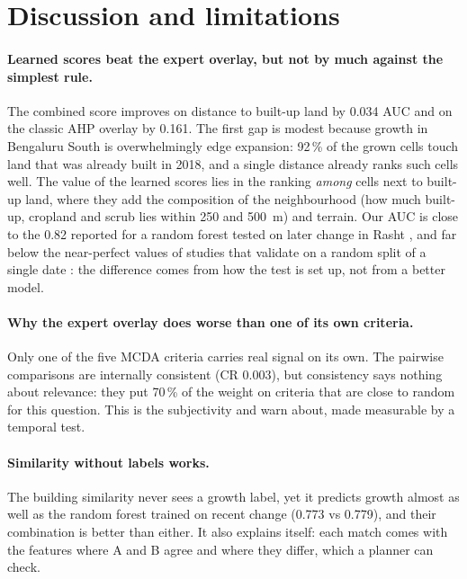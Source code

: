 \section{Discussion and limitations}\label{sec:discussion}

\paragraph{Learned scores beat the expert overlay, but not by much against the simplest rule.}
The combined score improves on distance to built-up land by 0.034 AUC and on the classic AHP
overlay by 0.161. The first gap is modest because growth in Bengaluru South is overwhelmingly
edge expansion: 92\,\% of the grown cells touch land that was already built in 2018, and a single
distance already ranks such cells well. The value of the learned scores lies in the ranking
\emph{among} cells next to built-up land, where they add the composition of the neighbourhood
(how much built-up, cropland and scrub lies within 250 and \SI{500}{\m}) and terrain. Our AUC
is close to the 0.82 reported for a random forest tested on later change in Rasht
\citep{ahmadlou2016}, and far below the near-perfect values of studies that validate on a
random split of a single date \citep{li2024}: the difference comes from how the test is set
up, not from a better model.

\paragraph{Why the expert overlay does worse than one of its own criteria.} Only one of the five
MCDA criteria carries real signal on its own. The pairwise comparisons are internally
consistent (CR 0.003), but consistency says nothing about relevance: they put 70\,\% of the
weight on criteria that are close to random for this question. This is the subjectivity
\citet{malczewski2004} and \citet{mosadeghi2015} warn about, made measurable by a temporal test.

\paragraph{Similarity without labels works.} The building similarity never sees a growth label,
yet it predicts growth almost as well as the random forest trained on recent change (0.773 vs
0.779), and their combination is better than either. It also explains itself: each match
comes with the features where A and B agree and where they differ, which a planner can check.

